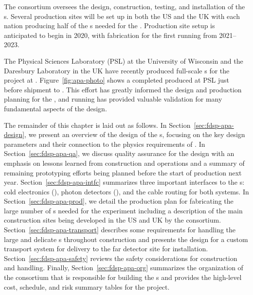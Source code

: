 The  consortium %
oversees the design, construction, testing, and installation of the s. Several  production sites will be set up in both the US and the UK with each nation producing  half of the s needed for the %
.  Production site setup is anticipated to begin in 2020, with  fabrication for the first \nominalmodsize {} running from 2021--2023.  

The Physical Sciences Laboratory (PSL) at the University of Wisconsin and the Daresbury Laboratory in the UK have recently produced full-scale s for the  project at . Figure~\ref{fig:apa-photo} shows a completed  produced at PSL just before shipment to . %
This effort has greatly informed the design and production planning for the  , and  running has provided valuable validation for many fundamental aspects of the   design. 

The remainder of this chapter is laid out as follows.  In Section~\ref{sec:fdsp-apa-design}, we present an overview of the design of the s, focusing on the key design parameters and their connection to the physics requirements of .  In Section~\ref{sec:fdsp-apa-qa}, we discuss quality assurance for the design with an emphasis on lessons learned from  construction and operations and a summary of remaining prototyping efforts being planned before the start of production next year. Section~\ref{sec:fdsp-apa-intfc} summarizes three important interfaces to the s:  cold electronics (), photon detectors (), and the cable routing for both systems.  In Section~\ref{sec:fdsp-apa-prod}, we detail the production plan for fabricating the large number of s needed for the experiment including a description of the main construction sites being developed in the US and UK by the  consortium.  Section~\ref{sec:fdsp-apa-transport} describes some requirements for handling the large and delicate s throughout construction and presents the design for a custom transport system for delivery to the far detector site for installation. Section~\ref{sec:fdsp-apa-safety} reviews the safety considerations for  construction and handling. Finally,  Section~\ref{sec:fdsp-apa-org} summarizes the organization of the  consortium that is responsible for building the s and provides the high-level cost, schedule, and risk summary tables for the project. 

